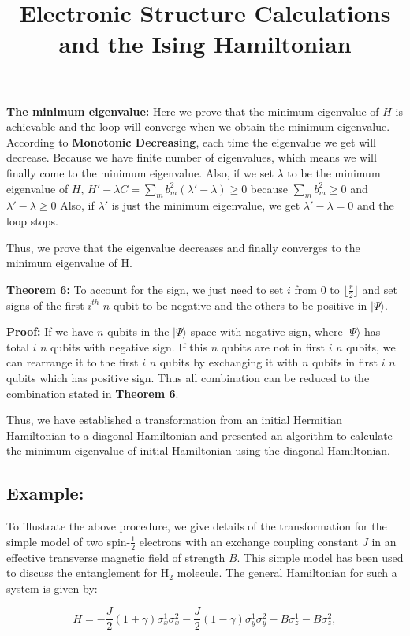 \documentclass{article}
\newcommand\x[1]{\sigma_x^{#1}}
\newcommand\y[1]{\sigma_y^{#1}}
\newcommand\z[1]{\sigma_z^{#1}}\title{Electronic Structure Calculations and the Ising Hamiltonian}
\begin{document}
{\bf The minimum eigenvalue:} Here we prove that the minimum eigenvalue of $H$ is achievable and the loop will converge when we obtain the minimum eigenvalue. According to {\bf Monotonic Decreasing}, each time the eigenvalue we get will decrease. Because we have finite number of eigenvalues, which means we will finally come to the minimum eigenvalue. Also, if we set $\lambda$ to be the minimum eigenvalue of $H$, $H'-\lambda C = \sum_m b_m^2 (\lambda'-\lambda)\geq 0$ because $\sum_m b_m^2\geq 0$ and $\lambda'-\lambda \geq 0$ Also, if $\lambda'$ is just the minimum eigenvalue, we get $\lambda'-\lambda=0$ and the loop stops.

Thus, we prove that the eigenvalue decreases and finally converges to the minimum eigenvalue of H.

{\bf Theorem 6:} To account for the sign, we just need to set $i$ from $0$ to $\lfloor\frac{r}{2}\rfloor$ and set signs of the first $i^{th}$ $n$-qubit to be negative and the others to be positive in $|\Psi\rangle$.

{\bf Proof:} If we have $n$ qubits in the $|\Psi\rangle$ space with negative sign, where $|\Psi\rangle$ has total $i$ $n$ qubits with negative sign. If this $n$ qubits are not in first $i$ $n$ qubits, we can rearrange it to the first $i$ $n$ qubits by exchanging it with $n$ qubits in first $i$ $n$ qubits which has positive sign. Thus all combination can be reduced to the combination stated in {\bf Theorem 6}.

Thus, we have established a transformation from an initial Hermitian Hamiltonian to a diagonal Hamiltonian and presented an algorithm to calculate the minimum eigenvalue of initial Hamiltonian using the diagonal Hamiltonian.    


\subsection*{Example:}

To illustrate the above procedure, we give details of the transformation for the simple model of two spin-$\frac{1}{2}$ electrons with an exchange coupling constant $J$ in an effective transverse magnetic field of strength $B$. This simple model has been used to discuss the entanglement for H$_2$ molecule\cite{huang2005entanglement}. The general Hamiltonian for such a system is given by:

\begin{equation}
H=-\frac{J}{2}(1+\gamma)\x{1}\x{2}-\frac{J}{2}(1-\gamma)\y{1}\y{2}-B\z{1}-B\z{2} ,
\end{equation}
\end{document}

